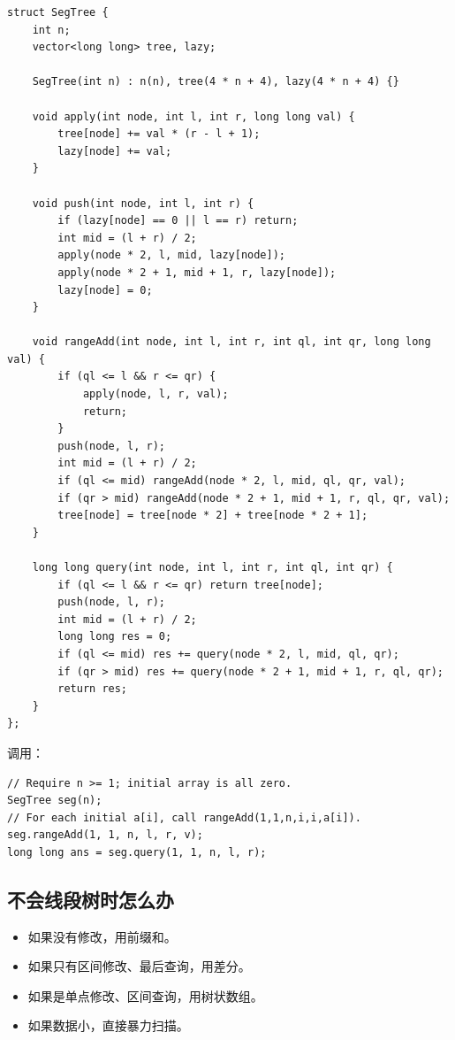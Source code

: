 \begin{lstlisting}
struct SegTree {
    int n;
    vector<long long> tree, lazy;

    SegTree(int n) : n(n), tree(4 * n + 4), lazy(4 * n + 4) {}

    void apply(int node, int l, int r, long long val) {
        tree[node] += val * (r - l + 1);
        lazy[node] += val;
    }

    void push(int node, int l, int r) {
        if (lazy[node] == 0 || l == r) return;
        int mid = (l + r) / 2;
        apply(node * 2, l, mid, lazy[node]);
        apply(node * 2 + 1, mid + 1, r, lazy[node]);
        lazy[node] = 0;
    }

    void rangeAdd(int node, int l, int r, int ql, int qr, long long val) {
        if (ql <= l && r <= qr) {
            apply(node, l, r, val);
            return;
        }
        push(node, l, r);
        int mid = (l + r) / 2;
        if (ql <= mid) rangeAdd(node * 2, l, mid, ql, qr, val);
        if (qr > mid) rangeAdd(node * 2 + 1, mid + 1, r, ql, qr, val);
        tree[node] = tree[node * 2] + tree[node * 2 + 1];
    }

    long long query(int node, int l, int r, int ql, int qr) {
        if (ql <= l && r <= qr) return tree[node];
        push(node, l, r);
        int mid = (l + r) / 2;
        long long res = 0;
        if (ql <= mid) res += query(node * 2, l, mid, ql, qr);
        if (qr > mid) res += query(node * 2 + 1, mid + 1, r, ql, qr);
        return res;
    }
};
\end{lstlisting}

调用：

\begin{lstlisting}
// Require n >= 1; initial array is all zero.
SegTree seg(n);
// For each initial a[i], call rangeAdd(1,1,n,i,i,a[i]).
seg.rangeAdd(1, 1, n, l, r, v);
long long ans = seg.query(1, 1, n, l, r);
\end{lstlisting}

\subsection{不会线段树时怎么办}

\begin{itemize}
  \item 如果没有修改，用前缀和。
  \item 如果只有区间修改、最后查询，用差分。
  \item 如果是单点修改、区间查询，用树状数组。
  \item 如果数据小，直接暴力扫描。
\end{itemize}

